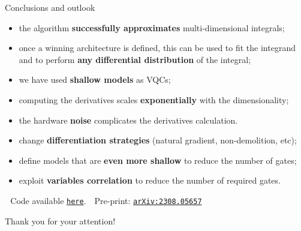 \documentclass[8pt, xcolor={svgnames}, hyperref={linkcolor=black}]{beamer}
\begin{document}
\begin{frame}{Conclusions and outlook}
\pause
\begin{tcolorbox}[colback=blue!10, title=Some final comments]
\begin{itemize}[noitemsep]
    \item[\faThumbsOUp] the algorithm \textbf{successfully approximates} multi-dimensional integrals;
    \item[\faThumbsOUp] once a winning architecture is defined, this can be used to fit the integrand
    and to perform \textbf{any differential distribution} of the integral;
    \item[\faThumbsOUp] we have used \textbf{shallow models} as VQCs;
    \item[\faThumbsODown] computing the derivatives scales \textbf{exponentially} 
    with the dimensionality;
    \item[\faThumbsODown] the hardware \textbf{noise} complicates the derivatives calculation.
\end{itemize}
\end{tcolorbox}

\pause
\begin{tcolorbox}[colback=red!10, title=How to do better?]
\begin{itemize}[noitemsep]
\item[\faSend] change \textbf{differentiation strategies} (natural gradient, non-demolition, etc);
\item[\faSend] define models that are \textbf{even more shallow} to reduce the number of gates;
\item[\faSend] exploit \textbf{variables correlation} to reduce the number of required gates.
\end{itemize}
\end{tcolorbox}

\pause
\vspace{0.7cm}
\faGithub\,\, Code available \href{https://github.com/qiboteam/QiNNtegrate/tree/main}{\texttt{here}}.
\hfill
\faBook\,\, Pre-print: \href{https://arxiv.org/abs/2308.05657}{\texttt{arXiv:2308.05657}}
\end{frame}

\begin{frame}
\centering
\Large Thank you for your attention!
\end{frame}
\end{document}
